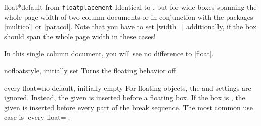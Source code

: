 \begin{docTcbKey}{float*}{}{default from \texttt{floatplacement}}
  Identical to , but for wide boxes spanning the whole page
  width of two column documents or in conjunction with the packages
  |multicol| or |paracol|. Note that you have to set |width=\textwidth|
  additionally, if the box should span the whole page width in these cases!
\begin{dispListing}
\begin{tcolorbox}[float*=b, title=Floating box from |float*|,width=\textwidth,
    enhanced,watermark text={I'm also floating}]
  In this single column document, you will see no difference to |float|.
\end{tcolorbox}
\end{dispListing}
\end{docTcbKey}
{\tcbusetemp}


\begin{docTcbKey}{nofloat}{}{style, initially set}
  Turns the floating behavior off.
\end{docTcbKey}


\begin{docTcbKey}[][doc new=2014-09-19]{every float}{=}{no default, initially empty}
  For floating objects, the  and 
  settings are ignored. Instead, the given  is inserted before
  a floating box. If the box is , the given  is
  inserted before every part of the break sequence.
  The most common use case is |every float=\centering|.

\begin{dispListing}
\end{dispListing}
{\tcbusetemp}

\end{docTcbKey}



